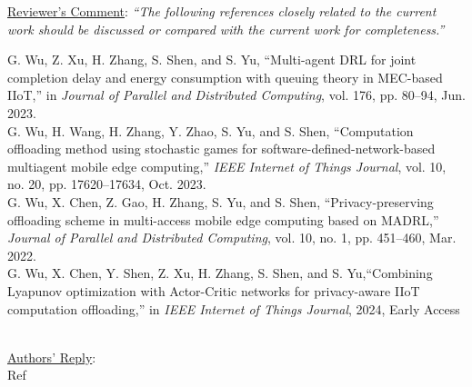 \documentclass[12pt,draftclsnofoot,onecolumn]{IEEEtran}
\newcommand{\rev}[1]{{\color{blue}#1}} %
\newcommand{\rev}[1]{#1}
\newenvironment{my}[2]%
{\begin{list}{}%
{\setlength{\rightmargin}{#1}\setlength{\leftmargin}{#2}}%


 \item[]{}

} {\end{list}}
\begin{document}
\begin{enumerate}
\newpage
	\item \underline{Reviewer's Comment}: 
	\textit{``The following references closely related to the current work should be discussed or compared with the current work for completeness.''} \newline
		\begin{my}{1cm}{1cm}
		\rev{
			{\small
				\noindent\cite{b35} G. Wu, Z. Xu, H. Zhang, S. Shen, and S. Yu,  ``Multi-agent DRL for joint completion delay and energy consumption with queuing theory in MEC-based IIoT,'' in \textit{Journal of Parallel and Distributed Computing}, vol. 176, pp. 80–94, Jun. 2023.\\[6pt]
				\cite{b38} G. Wu, H. Wang, H. Zhang, Y. Zhao, S. Yu, and S. Shen, ``Computation offloading method using stochastic games for software-defined-network-based multiagent mobile edge computing,'' \textit{IEEE Internet of Things Journal}, vol. 10, no. 20, pp. 17620–17634, Oct. 2023.\\[6pt]
				\cite{b37} G. Wu, X. Chen, Z. Gao, H. Zhang, S. Yu, and S. Shen, ``Privacy-preserving offloading scheme in multi-access mobile edge computing based on MADRL,'' \textit{Journal of Parallel and Distributed Computing}, vol. 10, no. 1, pp. 451--460, Mar. 2022.\\[6pt]
				\cite{b39} G. Wu, X. Chen, Y. Shen, Z. Xu, H. Zhang, S. Shen, and S. Yu,``Combining Lyapunov optimization with Actor-Critic networks for privacy-aware IIoT computation offloading,'' in \textit{IEEE Internet of Things Journal}, 2024, Early Access\\[10pt]}\\}
	\end{my}

	
	\underline{Authors' Reply}:\\
	
	Ref
	
\end{enumerate}

\newpage
\end{document}
